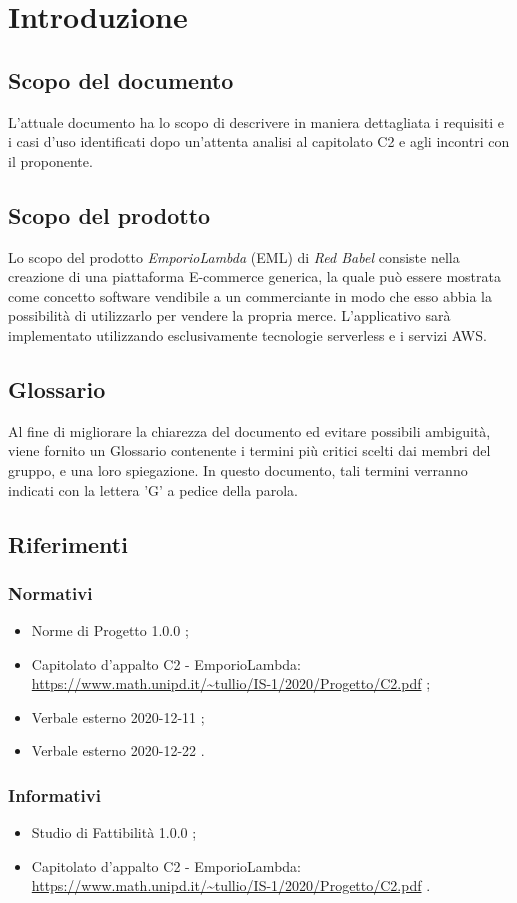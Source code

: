 \section{Introduzione}
\subsection{Scopo del documento}
L'attuale documento ha lo scopo di descrivere in maniera dettagliata i requisiti e i casi d'uso identificati dopo un'attenta analisi al capitolato C2 e agli incontri con il proponente.
\subsection{Scopo del prodotto}
Lo scopo del prodotto \textit{EmporioLambda} (EML) di \textit{Red Babel} consiste nella creazione di una piattaforma E-commerce generica, la quale può essere mostrata come concetto software vendibile a un commerciante in modo che esso abbia la possibilità di utilizzarlo per vendere la propria merce. L'applicativo sarà implementato utilizzando esclusivamente tecnologie serverless e i servizi AWS.
\subsection{Glossario}
Al fine di migliorare la chiarezza del documento ed evitare possibili ambiguità, viene fornito un Glossario contenente i termini più critici scelti dai membri del gruppo, e una loro spiegazione. In questo documento, tali termini verranno indicati con la lettera 'G' a pedice della parola.
\subsection{Riferimenti}
\subsubsection{Normativi}
\begin{itemize}
\item Norme di Progetto 1.0.0 ;
\item Capitolato d'appalto C2 - EmporioLambda: \\ \url{https://www.math.unipd.it/~tullio/IS-1/2020/Progetto/C2.pdf} ;
\item Verbale esterno 2020-12-11 ;
\item Verbale esterno 2020-12-22 .
\end{itemize}
\subsubsection{Informativi}
\begin{itemize}
\item Studio di Fattibilità 1.0.0 ;
\item Capitolato d'appalto C2 - EmporioLambda: \\ \url{https://www.math.unipd.it/~tullio/IS-1/2020/Progetto/C2.pdf} .
\end{itemize}